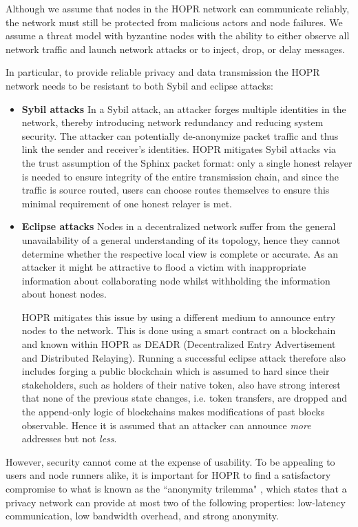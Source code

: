 Although we assume that nodes in the HOPR network can communicate reliably, the network must still be protected from malicious actors and node failures. We assume a threat model with byzantine nodes with the ability to either observe all network traffic and launch network attacks or to inject, drop, or delay messages.

In particular, to provide reliable privacy and data transmission the HOPR network needs to be resistant to both Sybil and eclipse attacks:

\begin{itemize}
    \item \textbf{Sybil attacks}
          In a Sybil attack, an attacker forges multiple identities in the network, thereby introducing network redundancy and reducing system security. The attacker can potentially de-anonymize packet traffic and thus link the sender and receiver's identities. HOPR mitigates Sybil attacks via the trust assumption of the Sphinx packet format: only a single honest relayer is needed to ensure integrity of the entire transmission chain, and since the traffic is source routed, users can choose routes themselves to ensure this minimal requirement of one honest relayer is met.
    \item \textbf{Eclipse attacks}
          Nodes in a decentralized network suffer from the general unavailability of a general understanding of its topology, hence they cannot determine whether the respective local view is complete or accurate. As an attacker it might be attractive to flood a victim with inappropriate information about collaborating node whilst withholding the information about honest nodes.

          HOPR mitigates this issue by using a different medium to announce entry nodes to the network. This is done using a smart contract on a blockchain and known within HOPR as DEADR (Decentralized Entry Advertisement and Distributed Relaying). Running a successful eclipse attack therefore also includes forging a public blockchain which is assumed to hard since their stakeholders, such as holders of their native token, also have strong interest that none of the previous state changes, i.e. token transfers, are dropped and the append-only logic of blockchains makes modifications of past blocks observable. Hence it is assumed that an attacker can announce \textit{more} addresses but not \textit{less}.

\end{itemize}
However, security cannot come at the expense of usability. To be appealing to users and node runners alike, it is important for HOPR to find a satisfactory compromise to what is known as the ``anonymity trilemma" \cite{AnonymityTrilemma}, which states that a privacy network can provide at most two of the following properties: low-latency communication, low bandwidth overhead, and strong anonymity.

